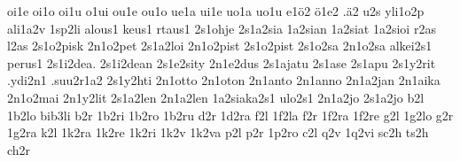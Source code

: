 {oi1e
oi1o
oi1u
o1ui %
ou1e
ou1o
ue1a
ui1e
uo1a
uo1u
e1ö2
ö1e2
.ä2     %
%
%
u2s         %
yli1o2p     %
ali1a2v     %
1sp2li      %
alous1
keus1       %
rtaus1
2s1ohje     %
2s1a2sia    %
1a2sian     %
1a2siat     %
1a2sioi     %
r2as l2as   %
2s1o2pisk   %
2n1o2pet
2s1a2loi
2n1o2pist    %
2s1o2pist
2s1o2sa      %
2n1o2sa      %
alkei2s1
perus1
2s1i2dea. 2s1i2dean
2s1e2sity    %
2n1e2dus     %
2s1ajatu     %
2s1ase
2s1apu
2s1y2rit     %
.ydi2n1
.suu2r1a2    %
2s1y2hti
2n1otto 2n1oton
2n1anto 2n1anno
2n1a2jan 2n1aika
2n1o2mai
2n1y2lit
2s1a2len
2n1a2len
1a2siaka2s1
ulo2s1        %
2n1a2jo       %
2s1a2jo
%
%
%
b2l 1b2lo bib3li
b2r 1b2ri 1b2ro 1b2ru
d2r 1d2ra
f2l 1f2la
f2r 1f2ra 1f2re
g2l 1g2lo
g2r 1g2ra
k2l
1k2ra 1k2re 1k2ri
1k2v 1k2va
p2l
p2r 1p2ro
c2l
q2v 1q2vi
sc2h ts2h
ch2r
}
